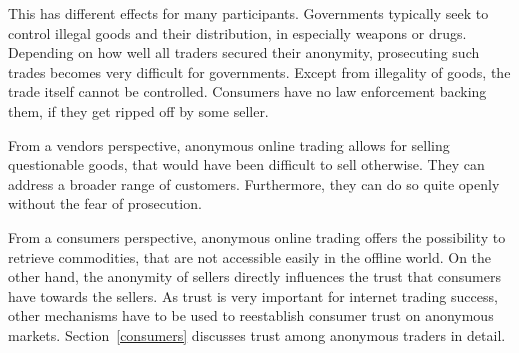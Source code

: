 This has different effects for many participants. Governments typically seek to control illegal goods and their distribution, in especially weapons or drugs. Depending on how well all traders secured their anonymity, prosecuting such trades becomes very difficult for governments. Except from illegality of goods, the trade itself cannot be controlled. Consumers have no law enforcement backing them, if they get ripped off by some seller.

From a vendors perspective, anonymous online trading allows for selling questionable goods, that would have been difficult to sell otherwise. They can address a broader range of customers. Furthermore, they can do so quite openly without the fear of prosecution.

From a consumers perspective, anonymous online trading offers the possibility to retrieve commodities, that are not accessible easily in the offline world. On the other hand, the anonymity of sellers directly influences the trust that consumers have towards the sellers. As trust is very important for internet trading success\cite{internetTrust2004}, other mechanisms  have to be used to reestablish consumer trust on anonymous markets. Section~\ref{consumers} discusses trust among anonymous traders in detail.